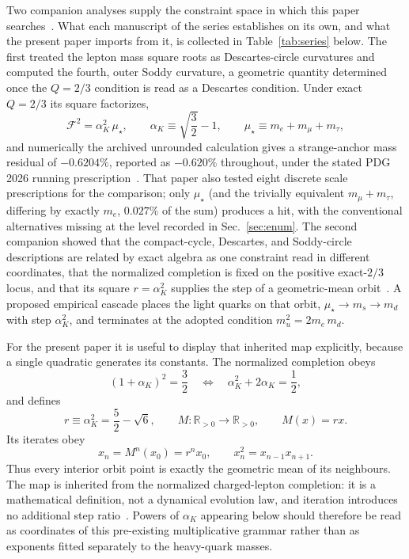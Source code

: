 \documentclass[aps,twocolumn,superscriptaddress,nofootinbib,floatfix]{revtex4-2}
\newcommand{\mstar}{\mu_\star}
\newcommand{\alphaK}{\alpha_K}
\newcommand{\R}{\mathbb{R}}
\begin{document}
Two companion analyses supply the constraint space in which this paper searches~\cite{BrilliantAPPB,BrilliantMPLA}. What each manuscript of the series establishes on its own, and what the present paper imports from it, is collected in Table~\ref{tab:series} below. The first treated the lepton mass square roots as Descartes-circle curvatures and computed the fourth, outer Soddy curvature, a geometric quantity determined once the $Q=2/3$ condition is read as a Descartes condition. Under exact $Q=2/3$ its square factorizes,
\begin{equation}
\mathcal F^2=\alpha_K^2\,\mstar,
\qquad
\alpha_K\equiv\sqrt{\frac32}-1,
\qquad
\mstar\equiv m_e+m_\mu+m_\tau,
\label{eq:f2}
\end{equation}
and numerically the archived unrounded calculation gives a strange-anchor mass residual of $-0.6204\%$, reported as $-0.620\%$ throughout, under the stated PDG 2026 running prescription~\cite{BrilliantAPPB}. That paper also tested eight discrete scale prescriptions for the comparison; only $\mstar$ (and the trivially equivalent $m_\mu+m_\tau$, differing by exactly $m_e$, $0.027\%$ of the sum) produces a hit, with the conventional alternatives missing at the level recorded in Sec.~\ref{sec:enum}. The second companion showed that the compact-cycle, Descartes, and Soddy-circle descriptions are related by exact algebra as one constraint read in different coordinates, that the normalized completion is fixed on the positive exact-$2/3$ locus, and that its square $r=\alpha_K^2$ supplies the step of a geometric-mean orbit~\cite{BrilliantMPLA}. A proposed empirical cascade places the light quarks on that orbit, $\mstar\to m_s\to m_d$ with step $\alpha_K^2$, and terminates at the adopted condition $m_u^2=2m_e\,m_d$.

For the present paper it is useful to display that inherited map explicitly, because a single quadratic generates its constants. The normalized completion obeys
\begin{equation}
(1+\alphaK)^2=\frac32
\quad\Longleftrightarrow\quad
\alphaK^2+2\alphaK=\frac12,
\label{eq:quadratic}
\end{equation}
and defines
\begin{equation}
r\equiv\alphaK^2=\frac52-\sqrt6,
\qquad
M:\R_{>0}\to\R_{>0},
\qquad
M(x)=rx .
\label{eq:companionmap}
\end{equation}
Its iterates obey
\begin{equation}
x_n=M^n(x_0)=r^n x_0,
\qquad
x_n^2=x_{n-1}x_{n+1}.
\label{eq:companionorbit}
\end{equation}
Thus every interior orbit point is exactly the geometric mean of its neighbours. The map is inherited from the normalized charged-lepton completion: it is a mathematical definition, not a dynamical evolution law, and iteration introduces no additional step ratio~\cite{BrilliantMPLA}. Powers of $\alphaK$ appearing below should therefore be read as coordinates of this pre-existing multiplicative grammar rather than as exponents fitted separately to the heavy-quark masses.
\end{document}
